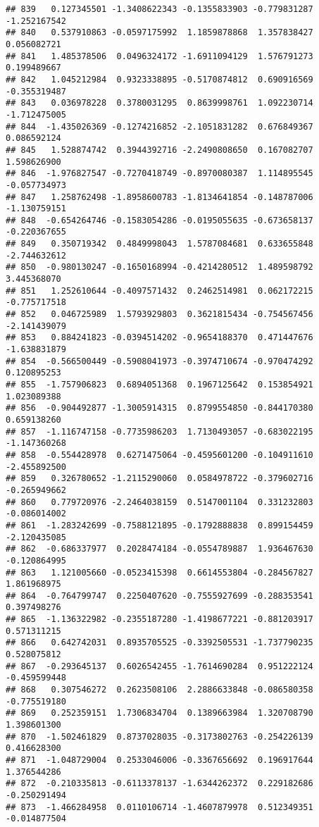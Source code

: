 \documentclass[
]{article}
\begin{document}
\begin{verbatim}
## 839   0.127345501 -1.3408622343 -0.1355833903 -0.779831287 -1.252167542
## 840   0.537910863 -0.0597175992  1.1859878868  1.357838427  0.056082721
## 841   1.485378506  0.0496324172 -1.6911094129  1.576791273  0.199489667
## 842   1.045212984  0.9323338895 -0.5170874812  0.690916569 -0.355319487
## 843   0.036978228  0.3780031295  0.8639998761  1.092230714 -1.712475005
## 844  -1.435026369 -0.1274216852 -2.1051831282  0.676849367  0.086592124
## 845   1.528874742  0.3944392716 -2.2490808650  0.167082707  1.598626900
## 846  -1.976827547 -0.7270418749 -0.8970080387  1.114895545 -0.057734973
## 847   1.258762498 -1.8958600783 -1.8134641854 -0.148787006 -1.130759151
## 848  -0.654264746 -0.1583054286 -0.0195055635 -0.673658137 -0.220367655
## 849   0.350719342  0.4849998043  1.5787084681  0.633655848 -2.744632612
## 850  -0.980130247 -0.1650168994 -0.4214280512  1.489598792  3.445368070
## 851   1.252610644 -0.4097571432  0.2462514981  0.062172215 -0.775717518
## 852   0.046725989  1.5793929803  0.3621815434 -0.754567456 -2.141439079
## 853   0.884241823 -0.0394514202 -0.9654188370  0.471447676 -1.638831879
## 854  -0.566500449 -0.5908041973 -0.3974710674 -0.970474292  0.120895253
## 855  -1.757906823  0.6894051368  0.1967125642  0.153854921  1.023089388
## 856  -0.904492877 -1.3005914315  0.8799554850 -0.844170380  0.659138260
## 857  -1.116747158 -0.7735986203  1.7130493057 -0.683022195 -1.147360268
## 858  -0.554428978  0.6271475064 -0.4595601200 -0.104911610 -2.455892500
## 859   0.326780652 -1.2115290060  0.0584978722 -0.379602716 -0.265949662
## 860   0.779720976 -2.2464038159  0.5147001104  0.331232803 -0.086014002
## 861  -1.283242699 -0.7588121895 -0.1792888838  0.899154459 -2.120435085
## 862  -0.686337977  0.2028474184 -0.0554789887  1.936467630 -0.120864995
## 863   1.121005660 -0.0523415398  0.6614553804 -0.284567827  1.861968975
## 864  -0.764799747  0.2250407620 -0.7555927699 -0.288353541  0.397498276
## 865  -1.136322982 -0.2355187280 -1.4198677221 -0.881203917  0.571311215
## 866   0.642742031  0.8935705525 -0.3392505531 -1.737790235  0.528075812
## 867  -0.293645137  0.6026542455 -1.7614690284  0.951222124 -0.459599448
## 868   0.307546272  0.2623508106  2.2886633848 -0.086580358 -0.775519180
## 869   0.252359151  1.7306834704  0.1389663984  1.320708790  1.398601300
## 870  -1.502461829  0.8737028035 -0.3173802763 -0.254226139  0.416628300
## 871  -1.048729004  0.2533046006 -0.3367656692  0.196917644  1.376544286
## 872  -0.210335813 -0.6113378137 -1.6344262372  0.229182686 -0.250291494
## 873  -1.466284958  0.0110106714 -1.4607879978  0.512349351 -0.014877504

\end{verbatim}
\end{document}
